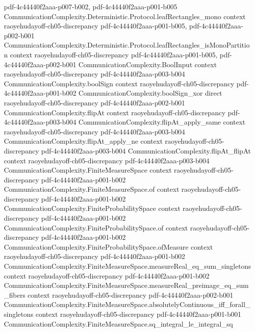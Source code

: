 \begin{lemma}
  {pdf-4c44440f2aaa-p007-b002,
    pdf-4c44440f2aaa-p001-b005}
\proofstep
  {CommunicationComplexity.Deterministic.Protocol.leafRectangles_mono}
  {context}
  {raoyehudayoff-ch05-discrepancy}
  {pdf-4c44440f2aaa-p001-b005,
    pdf-4c44440f2aaa-p002-b001}
\proofstep
  {CommunicationComplexity.Deterministic.Protocol.leafRectangles_isMonoPartition}
  {context}
  {raoyehudayoff-ch05-discrepancy}
  {pdf-4c44440f2aaa-p001-b005,
    pdf-4c44440f2aaa-p002-b001}
\proofstep
  {CommunicationComplexity.BoolInput}
  {context}
  {raoyehudayoff-ch05-discrepancy}
  {pdf-4c44440f2aaa-p003-b004}
\proofstep
  {CommunicationComplexity.boolSign}
  {context}
  {raoyehudayoff-ch05-discrepancy}
  {pdf-4c44440f2aaa-p001-b002}
\proofstep
  {CommunicationComplexity.boolSign_xor}
  {direct}
  {raoyehudayoff-ch05-discrepancy}
  {pdf-4c44440f2aaa-p002-b001}
\proofstep
  {CommunicationComplexity.flipAt}
  {context}
  {raoyehudayoff-ch05-discrepancy}
  {pdf-4c44440f2aaa-p003-b004}
\proofstep
  {CommunicationComplexity.flipAt_apply_same}
  {context}
  {raoyehudayoff-ch05-discrepancy}
  {pdf-4c44440f2aaa-p003-b004}
\proofstep
  {CommunicationComplexity.flipAt_apply_ne}
  {context}
  {raoyehudayoff-ch05-discrepancy}
  {pdf-4c44440f2aaa-p003-b004}
\proofstep
  {CommunicationComplexity.flipAt_flipAt}
  {context}
  {raoyehudayoff-ch05-discrepancy}
  {pdf-4c44440f2aaa-p003-b004}
\proofstep
  {CommunicationComplexity.FiniteMeasureSpace}
  {context}
  {raoyehudayoff-ch05-discrepancy}
  {pdf-4c44440f2aaa-p001-b002}
\proofstep
  {CommunicationComplexity.FiniteMeasureSpace.of}
  {context}
  {raoyehudayoff-ch05-discrepancy}
  {pdf-4c44440f2aaa-p001-b002}
\proofstep
  {CommunicationComplexity.FiniteProbabilitySpace}
  {context}
  {raoyehudayoff-ch05-discrepancy}
  {pdf-4c44440f2aaa-p001-b002}
\proofstep
  {CommunicationComplexity.FiniteProbabilitySpace.of}
  {context}
  {raoyehudayoff-ch05-discrepancy}
  {pdf-4c44440f2aaa-p001-b002}
\proofstep
  {CommunicationComplexity.FiniteProbabilitySpace.ofMeasure}
  {context}
  {raoyehudayoff-ch05-discrepancy}
  {pdf-4c44440f2aaa-p001-b002}
\proofstep
  {CommunicationComplexity.FiniteMeasureSpace.measureReal_eq_sum_singletons}
  {context}
  {raoyehudayoff-ch05-discrepancy}
  {pdf-4c44440f2aaa-p001-b002}
\proofstep
  {CommunicationComplexity.FiniteMeasureSpace.measureReal_preimage_eq_sum_fibers}
  {context}
  {raoyehudayoff-ch05-discrepancy}
  {pdf-4c44440f2aaa-p002-b001}
\proofstep
  {CommunicationComplexity.FiniteMeasureSpace.absolutelyContinuous_iff_forall_singletons}
  {context}
  {raoyehudayoff-ch05-discrepancy}
  {pdf-4c44440f2aaa-p001-b001}
\proofstep
  {CommunicationComplexity.FiniteMeasureSpace.sq_integral_le_integral_sq}

\end{lemma}
